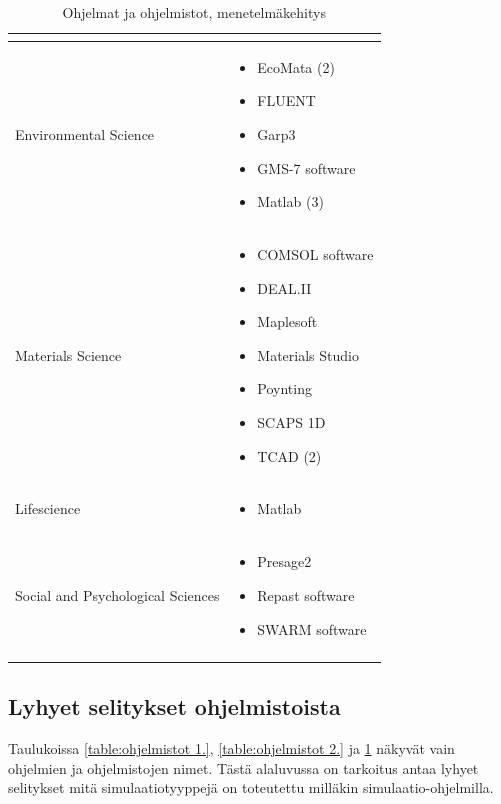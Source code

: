 \documentclass[utf8]{gradu3}
\begin{document}
\begin{longtable}[h]{|p{5cm}|p{8cm}|}
\begin{itemize}
    \end{itemize} \\
    \hline
    Environmental Science & \begin{itemize}
        \item EcoMata (2)
        \item FLUENT
        \item Garp3
        \item GMS-7 software
        \item Matlab (3)
    \end{itemize} \\
    \hline
    Materials Science & \begin{itemize}
        \item COMSOL software
        \item DEAL.II 
        \item Maplesoft
        \item Materials Studio
        \item Poynting
        \item SCAPS 1D
        \item TCAD (2)
    \end{itemize} \\
    \hline
    Lifescience & \begin{itemize}
        \item Matlab
    \end{itemize} \\
    \hline
    Social and Psychological Sciences & \begin{itemize}
        \item Presage2
        \item Repast software
        \item SWARM software
    \end{itemize} \\
    \hline
    \caption{Ohjelmat ja ohjelmistot, menetelmäkehitys}
    \label{table:ohjelmistot 3.}
\end{longtable}

\subsection{Lyhyet selitykset ohjelmistoista} \label{selitys}
Taulukoissa \ref{table:ohjelmistot 1.}, \ref{table:ohjelmistot 2.} 
ja \ref{table:ohjelmistot 3.} näkyvät vain ohjelmien ja ohjelmistojen nimet.
Tästä alaluvussa on tarkoitus antaa lyhyet selitykset mitä simulaatiotyyppejä 
on toteutettu milläkin simulaatio-ohjelmilla. 
\end{document}
